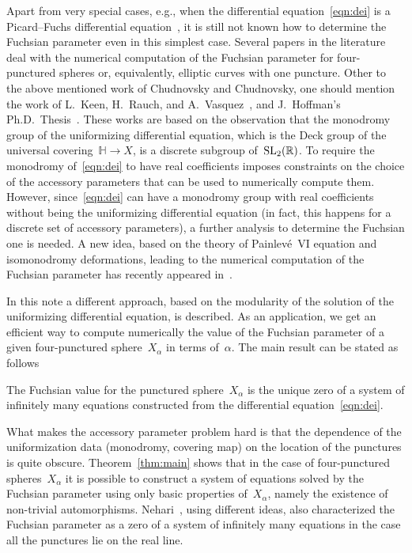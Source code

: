\documentclass[pdftex]{sigma}
\newcommand{\R}{\mathbb{R}}
\newcommand{\Po}{\mathbb{H}}
\numberwithin{equation}{section}
\begin{document}
Apart from very special cases, e.g., when the differential equation~\eqref{eqn:dei} is a Picard--Fuchs differential equation~\cite{BouwMoeller, ZagApery}, it is still not known how to determine the Fuchsian parameter even in this simplest case. Several papers in the literature deal with the numerical computation of the Fuchsian parameter for four-punctured spheres or, equivalently, elliptic curves with one puncture. Other to the above mentioned work of Chudnovsky and Chudnovsky, one should mention the work of L.~Keen, H.~Rauch, and A.~Vasquez~\cite{KRV}, and J.~Hoffman's Ph.D.~Thesis~\cite{Hoffman}.
These works are based on the observation that the monodromy group of the uniformizing differential equation, which is the Deck group of the universal covering~$\Po\to X$, is a discrete subgroup of~${\rm SL}_2(\R)$. To require the monodromy of~\eqref{eqn:dei} to have real coefficients imposes constraints on the choice of the accessory parameters that can be used to numerically compute them. However, since~\eqref{eqn:dei} can have a monodromy group with real coefficients without being the uniformizing differential equation (in fact, this happens for a discrete set of accessory parameters), a further analysis to determine the Fuchsian one is needed. A new idea, based on the theory of Painlev\'e~VI equation and isomonodromy deformations, leading to the numerical computation of the Fuchsian parameter has recently appeared in~\cite{Anselmo}.

In this note a different approach, based on the modularity of the solution of the uniformizing differential equation, is described. As an application, we get an efficient way to compute numerically the value of the Fuchsian parameter of a given four-punctured sphere~$X_\alpha$ in terms of~$\alpha$.
The main result can be stated as follows
\begin{theorem*}
The Fuchsian value for the punctured sphere~$X_\alpha$ is the unique zero of a system of infinitely many equations constructed from the differential equation~\eqref{eqn:dei}.
\end{theorem*}
What makes the accessory parameter problem hard is that the dependence of the uniformization data (monodromy, covering map) on the location of the punctures is quite obscure. Theorem~\ref{thm:main} shows that in the case of four-punctured spheres~$X_\alpha$ it is possible to construct a system of equations solved by the Fuchsian parameter using only basic properties of~$X_\alpha$, namely the existence of non-trivial automorphisms.
Nehari~\cite{Nehari}, using different ideas, also characterized the Fuchsian parameter as a zero of a system of infinitely many equations in the case all the punctures lie on the real line.
\end{document}
